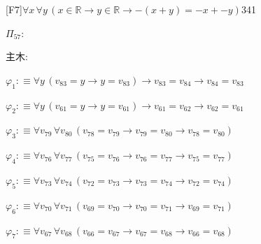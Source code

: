 \begin{fullproof}{[F7]}{$\forall x\,\forall y\,(x \in \mathbb{R} \to y \in \mathbb{R} \to -(x + y) = -x + -y)$}{341}
\begin{ptree}
\noLine
{}
\noLine
{}
\noLine
{}
\noLine
{}
\end{ptree}
\noindent$\Pi_{57}$:
\begin{ptree}
\noLine
{}
\end{ptree}
\noindent 主木:
\begin{ptree}
\noLine
{}
\noLine
{}
\end{ptree}
\begin{abbrevlist}
\item $\varphi_{1} :\equiv \forall y\,(v_{83} = y \to y = v_{83}) \to v_{83} = v_{84} \to v_{84} = v_{83}$
\item $\varphi_{2} :\equiv \forall y\,(v_{61} = y \to y = v_{61}) \to v_{61} = v_{62} \to v_{62} = v_{61}$
\item $\varphi_{3} :\equiv \forall v_{79}\,\forall v_{80}\,(v_{78} = v_{79} \to v_{79} = v_{80} \to v_{78} = v_{80})$
\item $\varphi_{4} :\equiv \forall v_{76}\,\forall v_{77}\,(v_{75} = v_{76} \to v_{76} = v_{77} \to v_{75} = v_{77})$
\item $\varphi_{5} :\equiv \forall v_{73}\,\forall v_{74}\,(v_{72} = v_{73} \to v_{73} = v_{74} \to v_{72} = v_{74})$
\item $\varphi_{6} :\equiv \forall v_{70}\,\forall v_{71}\,(v_{69} = v_{70} \to v_{70} = v_{71} \to v_{69} = v_{71})$
\item $\varphi_{7} :\equiv \forall v_{67}\,\forall v_{68}\,(v_{66} = v_{67} \to v_{67} = v_{68} \to v_{66} = v_{68})$

\end{abbrevlist}
\end{fullproof}
